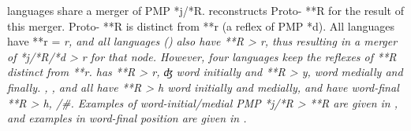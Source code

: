  languages share a merger of PMP *j/*R.
\citet{Nivens2017} reconstructs Proto- **R for the result of this merger.
Proto- **R is distinct from **r (a reflex of PMP *d).
All  languages have **r = \it{r},
and all  languages () also have **R
> \it{r}, thus resulting in a merger of *j/*R/*d > \it{r} for that node.
However, four languages keep the reflexes of **R distinct from **r.
 has **R > \it{r,
ʤ} word initially and **R > \it{y,} {\0} word medially and finally.
, , and  all have **R > \it{h} word initially
and medially, and have word-final **R > \it{h,} {\0} /{\gap}{\#}.
Examples of word-initial/medial PMP *j/*R > **R are given in
, and examples in word-final position are given in .

